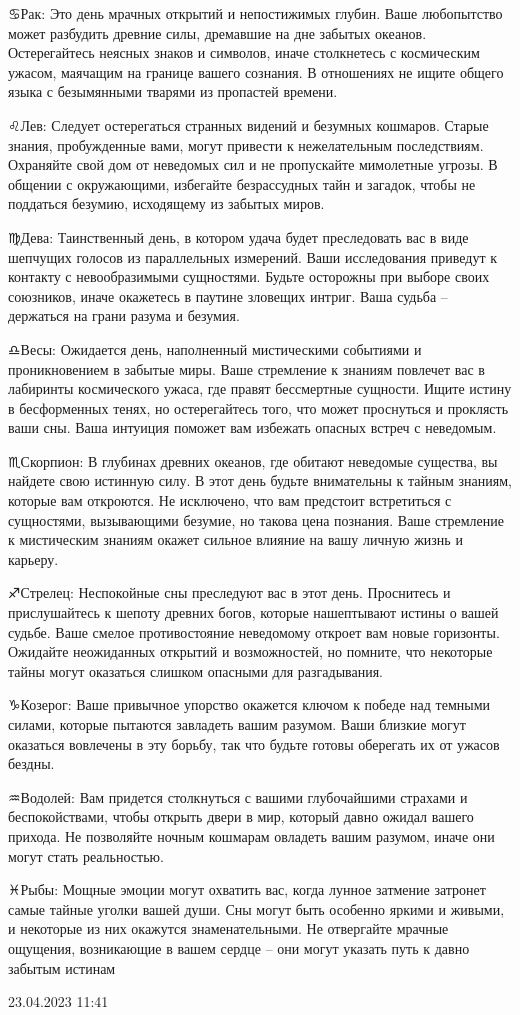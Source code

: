 \documentclass{article}
\begin{document}
\begin{multicols}{3}
♋️Рак: Это день мрачных открытий и непостижимых глубин. Ваше любопытство может разбудить древние силы, дремавшие на дне забытых океанов. Остерегайтесь неясных знаков и символов, иначе столкнетесь с космическим ужасом, маячащим на границе вашего сознания. В отношениях не ищите общего языка с безымянными тварями из пропастей времени.

♌️Лев: Следует остерегаться странных видений и безумных кошмаров. Старые знания, пробужденные вами, могут привести к нежелательным последствиям. Охраняйте свой дом от неведомых сил и не пропускайте мимолетные угрозы. В общении с окружающими, избегайте безрассудных тайн и загадок, чтобы не поддаться безумию, исходящему из забытых миров.

♍️Дева: Таинственный день, в котором удача будет преследовать вас в виде шепчущих голосов из параллельных измерений. Ваши исследования приведут к контакту с невообразимыми сущностями. Будьте осторожны при выборе своих союзников, иначе окажетесь в паутине зловещих интриг. Ваша судьба – держаться на грани разума и безумия.

♎️Весы: Ожидается день, наполненный мистическими событиями и проникновением в забытые миры. Ваше стремление к знаниям повлечет вас в лабиринты космического ужаса, где правят бессмертные сущности. Ищите истину в бесформенных тенях, но остерегайтесь того, что может проснуться и проклясть ваши сны. Ваша интуиция поможет вам избежать опасных встреч с неведомым.

♏️Скорпион: В глубинах древних океанов, где обитают неведомые существа, вы найдете свою истинную силу. В этот день будьте внимательны к тайным знаниям, которые вам откроются. Не исключено, что вам предстоит встретиться с сущностями, вызывающими безумие, но такова цена познания. Ваше стремление к мистическим знаниям окажет сильное влияние на вашу личную жизнь и карьеру.

♐️Стрелец: Неспокойные сны преследуют вас в этот день. Проснитесь и прислушайтесь к шепоту древних богов, которые нашептывают истины о вашей судьбе. Ваше смелое противостояние неведомому откроет вам новые горизонты. Ожидайте неожиданных открытий и возможностей, но помните, что некоторые тайны могут оказаться слишком опасными для разгадывания.

♑️Козерог: Ваше привычное упорство окажется ключом к победе над темными силами, которые пытаются завладеть вашим разумом. Ваши близкие могут оказаться вовлечены в эту борьбу, так что будьте готовы оберегать их от ужасов бездны.

♒️Водолей: Вам придется столкнуться с вашими глубочайшими страхами и беспокойствами, чтобы открыть двери в мир, который давно ожидал вашего прихода. Не позволяйте ночным кошмарам овладеть вашим разумом, иначе они могут стать реальностью.

♓️Рыбы: Мощные эмоции могут охватить вас, когда лунное затмение затронет самые тайные уголки вашей души. Сны могут быть особенно яркими и живыми, и некоторые из них окажутся знаменательными. Не отвергайте мрачные ощущения, возникающие в вашем сердце – они могут указать путь к давно забытым истинам

23.04.2023 11:41\closearticle

\end{multicols}
\end{document}
